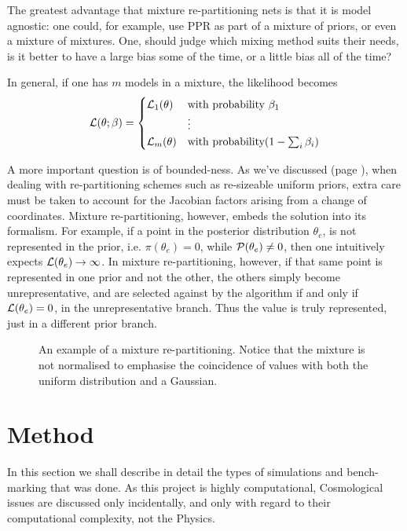 \documentclass[usenatbib]{mnras}
\begin{document}
The greatest advantage that mixture re-partitioning nets is
that it is model agnostic: one could, for example, use PPR as
part of a mixture of priors, or even a mixture of
mixtures. One, should judge which mixing method suits their
needs, is it better to have a large bias some of the time, or
a little bias all of the time?

In general,  if one has \(m\) models in a mixture, the likelihood becomes 
\begin{equation}
  {\cal L}(\theta; \beta)  = \begin{cases}
	{\cal L}_{1}(\theta) &  \text{with probability } \beta_{1}\\
		    &\vdots\\
	{\cal L}_{m}(\theta) & \text{with probability} (1- \sum_{i}\beta_{i})
	\end{cases}
\end{equation}


A more important question is of bounded-ness. As we've discussed
(page \pageref{domain-discussion}), when dealing with re-partitioning
schemes such as re-sizeable uniform priors, extra care must be
taken to account for the Jacobian factors arising from a change of
coordinates. Mixture re-partitioning, however, embeds the solution
into its formalism. For example, if a point in the posterior
distribution \(\theta_{e}\), is not represented in the prior, i.e.
\(\pi(\theta_{e}) = 0\), while \({\cal P}(\theta_{e}) \ne 0\), then
one intuitively expects \({\cal L}(\theta_{e}) \rightarrow
	\infty\). In mixture re-partitioning, however, if that same point is
represented in one prior and not the other, the others simply
become unrepresentative, and are selected against by the algorithm
if and only if \({\cal L}(\theta_{e}) = 0\), in the unrepresentative
branch. Thus the value is truly represented, just in a different
prior branch.

\begin{figure}
 
\caption{\label{orga652fad}
An example of a mixture re-partitioning. Notice that the mixture is not normalised to emphasise the coincidence of values with both the uniform distribution and a Gaussian.}
\end{figure}



\section{Method}
\label{sec:orge9b0115}
In this section we shall describe in detail the types of simulations
and bench-marking that was done. As this project is highly
computational, Cosmological issues are discussed only incidentally,
and only with regard to their computational complexity, not the
Physics.
\end{document}
